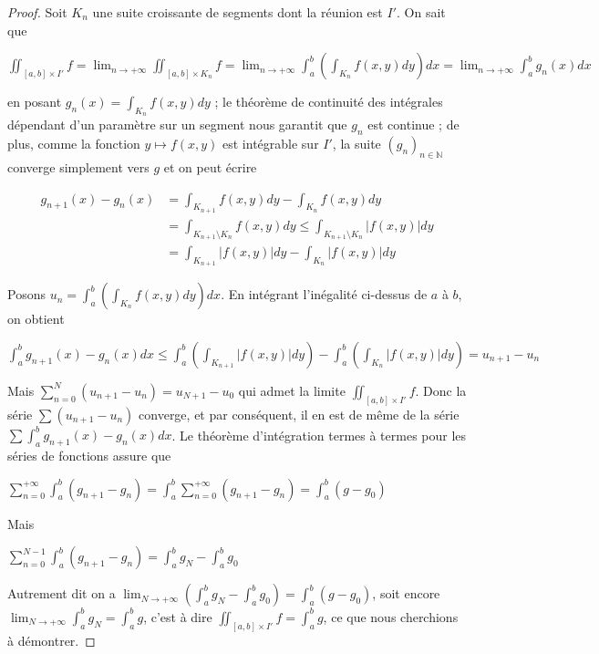   \begin{proof}
  Soit $K_n$ une suite croissante de segments dont la réunion est $I'$. On sait que
  
  $\iint_{[a,b] \times I'} f = \lim_{n \to +\infty} \iint_{[a,b] \times K_n} f = \lim_{n \to +\infty} \int_a^b \left(\int_{K_n} f(x,y) dy\right) dx = \lim_{n \to +\infty} \int_a^b g_n(x) dx$
  
  en posant $g_n(x) = \int_{K_n} f(x,y) dy$ ; le théorème de continuité des intégrales dépendant d'un paramètre sur un segment nous garantit que $g_n$ est continue ; de plus, comme la fonction $y \mapsto f(x,y)$ est intégrable sur $I'$, la suite $(g_n)_{n \in \mathbb{N}}$ converge simplement vers $g$ et on peut écrire
  
  \begin{align*}
  g_{n+1}(x) - g_n(x) &= \int_{K_{n+1}} f(x,y) dy - \int_{K_n} f(x,y) dy \\
  &= \int_{K_{n+1} \setminus K_n} f(x,y) dy \leq \int_{K_{n+1} \setminus K_n} |f(x,y)| dy \\
  &= \int_{K_{n+1}} |f(x,y)| dy - \int_{K_n} |f(x,y)| dy
  \end{align*}
  
  Posons $u_n = \int_a^b \left(\int_{K_n} f(x,y) dy\right) dx$. En intégrant l'inégalité ci-dessus de $a$ à $b$, on obtient
  
  $\int_a^b g_{n+1}(x) - g_n(x) dx \leq \int_a^b \left(\int_{K_{n+1}} |f(x,y)| dy\right) - \int_a^b \left(\int_{K_n} |f(x,y)| dy\right) = u_{n+1} - u_n$
  
  Mais $\sum_{n=0}^N (u_{n+1} - u_n) = u_{N+1} - u_0$ qui admet la limite $\iint_{[a,b] \times I'} f$. Donc la série $\sum (u_{n+1} - u_n)$ converge, et par conséquent, il en est de même de la série $\sum \int_a^b g_{n+1}(x) - g_n(x) dx$. Le théorème d'intégration termes à termes pour les séries de fonctions assure que
  
  $\sum_{n=0}^{+\infty} \int_a^b (g_{n+1} - g_n) = \int_a^b \sum_{n=0}^{+\infty} (g_{n+1} - g_n) = \int_a^b (g - g_0)$
  
  Mais
  
  $\sum_{n=0}^{N-1} \int_a^b (g_{n+1} - g_n) = \int_a^b g_N - \int_a^b g_0$
  
  Autrement dit on a $\lim_{N \to +\infty} \left(\int_a^b g_N - \int_a^b g_0\right) = \int_a^b (g - g_0)$, soit encore $\lim_{N \to +\infty} \int_a^b g_N = \int_a^b g$, c'est à dire $\iint_{[a,b] \times I'} f = \int_a^b g$, ce que nous cherchions à démontrer.
  \end{proof}
  

